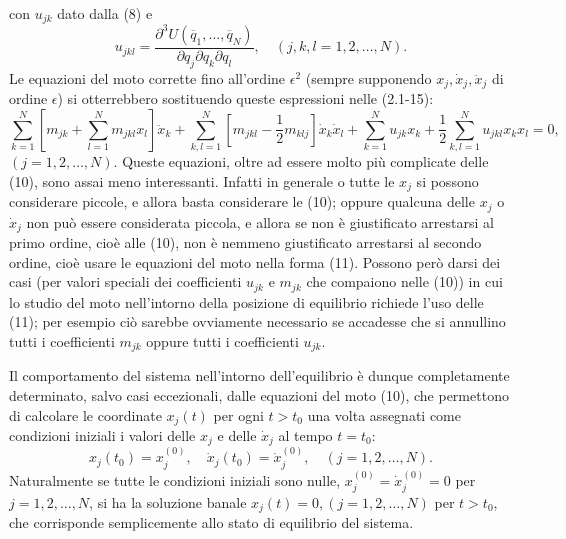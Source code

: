 \documentclass[11pt, a4paper]{book}
\numberwithin{equation}{section}
\begin{document}
con $u_{jk}$ dato dalla (8) e
\begin{equation*}
u_{jkl} = \frac{\partial^3 U(\overline{q}_1, \dots, \overline{q}_N)}{\partial q_j \partial q_k \partial q_l}, \quad (j, k, l = 1, 2, \dots, N).
\end{equation*}
Le equazioni del moto corrette fino all'ordine $\epsilon^2$ (sempre supponendo $x_j, \dot{x}_j, \ddot{x}_j$ di ordine $\epsilon$) si otterrebbero sostituendo queste espressioni nelle (2.1-15):
\begin{equation}
\sum_{k=1}^{N} \left[ m_{jk} + \sum_{l=1}^{N} m_{jkl} x_l \right] \ddot{x}_k + \sum_{k,l=1}^{N} \left[ m_{jkl} - \frac{1}{2} m_{klj} \right] \dot{x}_k \dot{x}_l + \sum_{k=1}^{N} u_{jk} x_k + \frac{1}{2} \sum_{k,l=1}^{N} u_{jkl} x_k x_l = 0,
\end{equation}
$(j = 1, 2, \dots, N)$. Queste equazioni, oltre ad essere molto più complicate delle (10), sono assai meno interessanti. Infatti in generale o tutte le $x_j$ si possono considerare piccole, e allora basta considerare le (10); oppure qualcuna delle $x_j$ o $\dot{x}_j$ non può essere considerata piccola, e allora se non è giustificato arrestarsi al primo ordine, cioè alle (10), non è nemmeno giustificato arrestarsi al secondo ordine, cioè usare le equazioni del moto nella forma (11). Possono però darsi dei casi (per valori speciali dei coefficienti $u_{jk}$ e $m_{jk}$ che compaiono nelle (10)) in cui lo studio del moto nell'intorno della posizione di equilibrio richiede l'uso delle (11); per esempio ciò sarebbe ovviamente necessario se accadesse che si annullino tutti i coefficienti $m_{jk}$ oppure tutti i coefficienti $u_{jk}$.

Il comportamento del sistema nell'intorno dell'equilibrio è dunque completamente determinato, salvo casi eccezionali, dalle equazioni del moto (10), che permettono di calcolare le coordinate $x_j(t)$ per ogni $t > t_0$ una volta assegnati come condizioni iniziali i valori delle $x_j$ e delle $\dot{x}_j$ al tempo $t = t_0$:
\begin{equation}
x_j(t_0) = x_j^{(0)}, \quad \dot{x}_j(t_0) = \dot{x}_j^{(0)}, \quad (j = 1, 2, \dots, N).
\end{equation}
Naturalmente se tutte le condizioni iniziali sono nulle, $x_j^{(0)} = \dot{x}_j^{(0)} = 0$ per $j = 1, 2, \dots, N$, si ha la soluzione banale $x_j(t) = 0, (j = 1, 2, \dots, N)$ per $t > t_0$, che corrisponde semplicemente allo stato di equilibrio del sistema.
\end{document}
